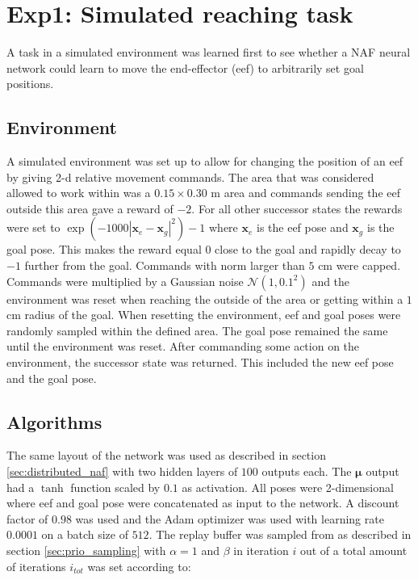 \section{Exp1: Simulated reaching task}

A task in a simulated environment was learned first to see whether a NAF neural
network could learn to move the end-effector (eef) to arbitrarily set goal positions.
\subsection{Environment}

A simulated environment was set up to allow for changing the position of an eef
by giving 2-d relative movement commands. The area that was considered allowed
to work within was a $0.15 \times 0.30$ m area and commands sending the eef
outside this area gave a reward of $-2$. For all other successor states the
rewards were set to $\exp\left(-1000|\mathbf{x}_e - \mathbf{x}_g|^2\right) - 1$
where $\mathbf{x}_e$ is the eef pose and $\mathbf{x}_g$ is the goal pose. This
makes the reward equal $0$ close to the goal and rapidly decay to $-1$ further
from the goal. Commands with norm larger than $5$ cm were capped. Commands were
multiplied by a Gaussian noise $\mathcal{N}(1, 0.1^2)$ and the environment was
reset when reaching the outside of the area or getting within a $1$ cm radius
of the goal. When resetting the environment, eef and goal poses were randomly
sampled within the defined area.  The goal pose remained the same until the
environment was reset. After commanding some action on the environment, the
successor state was returned. This included the new eef pose and the goal pose.

\subsection{Algorithms}

The same layout of the network was used as described in section
\ref{sec:distributed_naf} with two hidden layers of $100$ outputs each. The
$\mathbf{\mu}$ output had a $\tanh$ function scaled by $0.1$ as activation. All
poses were 2-dimensional where eef and goal pose were concatenated as input to
the network. A discount factor of $0.98$ was used and the Adam optimizer
\cite{kingma2014adam} was used with learning rate $0.0001$ on a batch size of
$512$. The replay buffer was sampled from as described in section
\ref{sec:prio_sampling} with $\alpha = 1$ and $\beta$ in iteration $i$ out of a
total amount of iterations $i_{tot}$ was set according to:

